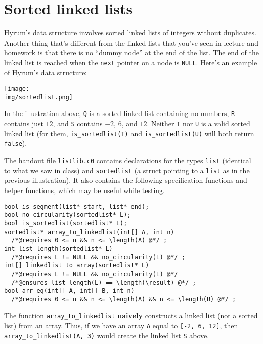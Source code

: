 \section*{Sorted linked lists}

Hyrum's data structure involves sorted linked lists of integers
without duplicates.
Another thing that's different from the linked
lists that you've seen in lecture and homework is that there is no
``dummy node'' at the end of the list.  The end of the linked list is
reached when the \lstinline'next' pointer on a node is
\lstinline'NULL'. Here's an example of Hyrum's data structure:
\begin{center}
  \texttt{[image: \\img/sortedlist.png]}
\end{center}
In the illustration above, \lstinline'Q' is a sorted linked list
containing no numbers, \lstinline'R' contains just $12$, and
\lstinline'S' contains $-2$, $6$, and $12$. Neither \lstinline'T' nor
\lstinline'U' is a valid sorted linked list (for them,
\lstinline'is_sortedlist(T)' and \lstinline'is_sortedlist(U)' will
both return \lstinline'false').

The handout file \lstinline'listlib.c0'  contains declarations for the types
\lstinline'list' (identical to what we saw in class) and
\lstinline'sortedlist' (a struct pointing to a \lstinline'list' as in
the previous illustration).  It also contains the following
specification functions and helper functions, which may be useful
while testing.

\begin{lstlisting}
bool is_segment(list* start, list* end);
bool no_circularity(sortedlist* L);
bool is_sortedlist(sortedlist* L);
sortedlist* array_to_linkedlist(int[] A, int n)
  /*@requires 0 <= n && n <= \length(A) @*/ ;
int list_length(sortedlist* L)
  /*@requires L != NULL && no_circularity(L) @*/ ;
int[] linkedlist_to_array(sortedlist* L)
  /*@requires L != NULL && no_circularity(L) @*/
  /*@ensures list_length(L) == \length(\result) @*/ ;
bool arr_eq(int[] A, int[] B, int n)
  /*@requires 0 <= n && n <= \length(A) && n <= \length(B) @*/ ;
\end{lstlisting}
The function \lstinline'array_to_linkedlist' \textbf{naively}
constructs a linked list (not a sorted list) from an array.  Thus, if
we have an array \lstinline'A' equal to \lstinline'[-2, 6, 12]', then
\lstinline'array_to_linkedlist(A, 3)' would create the linked list
\lstinline'S' above.

